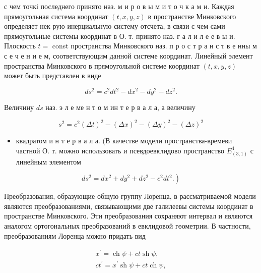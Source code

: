 \documentclass[10pt]{article}
\begin{document}
с чем точкі последнего принято наз. м и р о в ы м и т о ч к а м и. Каждая прямоугольная система координат $(t, x, y, z)$ в пространстве Минковского определяет нек-рую инерциальную систему отсчета, в связи с чем сами прямоугольные системы координат в О. т. принято наз. г а л и л е е в ы и. Плоскость $t=$ const пространства Минковского наз. п р о с т р а н с т в е нны м с е ч е н и е м, соответствующим данной системе координат. Линейный элемент пространства Минковского в прямоугольной системе координат $(t, x, y, z)$ может быть представлен в виде



\[

d s^{2}=c^{2} d t^{2}-d x^{2}-d y^{2}-d z^{2} .

\]



Величину $d s$ наз. э л е ме н т о м ин т е р в а л а, а величину



\[

s^{2}=c^{2}(\Delta t)^{2}-(\Delta x)^{2}-(\Delta y)^{2}-(\Delta z)^{2}

\]



\begin{itemize}

  \item квадратом и н т е р в а л а. (В качестве модели пространства-времеви частной О. т. можно использовать и псевдоевклидово пространство $E_{(3,1)}^{4}$ с линейным элементом

\end{itemize}



\[

\left.d s^{2}=d x^{2}+d y^{2}+d z^{2}-c^{2} d t^{2} .\right)

\]



Преобразования, образующие общую группу Лоренца, в рассматриваемой модели являются преобразованиями, связывающими две галилеевы системы координат в пространстве Минковского. Эти преобразования сохраняют интервал и являются аналогом ортогональных преобразований в евклидовой гөометрии. В частности, преобразованиям Лоренца можно придать вид



\[

\begin{gathered}

x^{\prime}=\operatorname{ch} \psi+c t \operatorname{sh} \psi, \\

c t^{\prime}=x^{\prime} \operatorname{sh} \psi+c t \operatorname{ch} \psi,

\end{gathered}

\]
\end{document}
